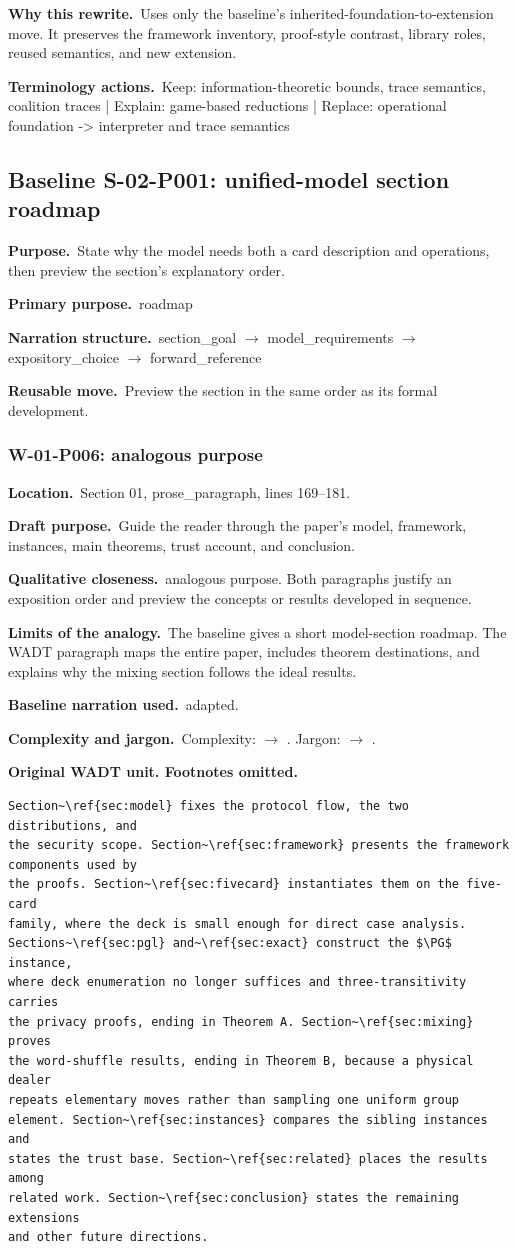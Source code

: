 \documentclass[10pt]{article}
\newcommand{\Field}[2]{\textbf{#1}\ #2\par}\newcommand{\Tag}[1]{\fcolorbox{black!25}{black!4}{\strut\scriptsize #1}}
\begin{document}
\Field{Why this rewrite.}{Uses only the baseline's inherited-foundation-to-extension move. It preserves the framework inventory, proof-style contrast, library roles, reused semantics, and new extension.}
\Field{Terminology actions.}{Keep: information-theoretic bounds, trace semantics, coalition traces | Explain: game-based reductions | Replace: operational foundation -> interpreter and trace semantics}
\par\smallskip
\clearpage\subsection{Baseline S-02-P001: unified-model section roadmap}
\colorbox{BaselineBlue}{\parbox{0.97\textwidth}{\Field{Purpose.}{State why the model needs both a card description and operations, then preview the section's explanatory order.}\Field{Primary purpose.}{roadmap}\Field{Narration structure.}{section\_goal $\rightarrow$ model\_requirements $\rightarrow$ expository\_choice $\rightarrow$ forward\_reference}\Field{Reusable move.}{Preview the section in the same order as its formal development.}}}
\subsubsection*{W-01-P006: analogous purpose}
\Field{Location.}{Section 01, prose\_paragraph, lines 169--181.}
\Field{Draft purpose.}{Guide the reader through the paper's model, framework, instances, main theorems, trust account, and conclusion.}
\Field{Qualitative closeness.}{analogous purpose. Both paragraphs justify an exposition order and preview the concepts or results developed in sequence.}
\Field{Limits of the analogy.}{The baseline gives a short model-section roadmap. The WADT paragraph maps the entire paper, includes theorem destinations, and explains why the mixing section follows the ideal results.}
\Field{Baseline narration used.}{adapted.}
\Field{Complexity and jargon.}{Complexity: \Tag{medium} $\rightarrow$ \Tag{medium}. Jargon: \Tag{medium} $\rightarrow$ \Tag{medium}.}
\textbf{Original WADT unit. Footnotes omitted.}
\begin{lstlisting}
Section~\ref{sec:model} fixes the protocol flow, the two distributions, and
the security scope. Section~\ref{sec:framework} presents the framework components used by
the proofs. Section~\ref{sec:fivecard} instantiates them on the five-card
family, where the deck is small enough for direct case analysis.
Sections~\ref{sec:pgl} and~\ref{sec:exact} construct the $\PG$ instance,
where deck enumeration no longer suffices and three-transitivity carries
the privacy proofs, ending in Theorem A. Section~\ref{sec:mixing} proves
the word-shuffle results, ending in Theorem B, because a physical dealer
repeats elementary moves rather than sampling one uniform group element. Section~\ref{sec:instances} compares the sibling instances and
states the trust base. Section~\ref{sec:related} places the results among
related work. Section~\ref{sec:conclusion} states the remaining extensions
and other future directions.
\end{lstlisting}
\end{document}
